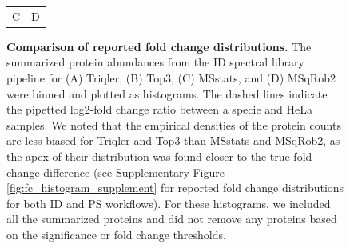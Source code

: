 \documentclass[10pt,letterpaper]{article}
\begin{document}
\begin{figure}[hbt]
\begin{tabular}{cc}
        C & D 
    \end{tabular}
    \caption{{\bf Comparison of reported fold change distributions.} The summarized protein abundances from the ID spectral library pipeline for (A) Triqler, (B) Top3, (C) MSstats, and (D) MSqRob2 were binned and plotted as histograms. The dashed lines indicate the pipetted log2-fold change ratio between a specie and HeLa samples. We noted that the empirical densities of the protein counts are less biased for Triqler and Top3 than MSstats and MSqRob2, as the apex of their distribution was found closer to the true fold change difference (see Supplementary Figure \ref{fig:fc_histogram_supplement} for reported fold change distributions for both ID and PS workflows). For these histograms, we included all the summarized proteins and did not remove any proteins based on  the significance or fold change thresholds. \label{fig:fc_histogram}}
\end{figure}
\end{document}
